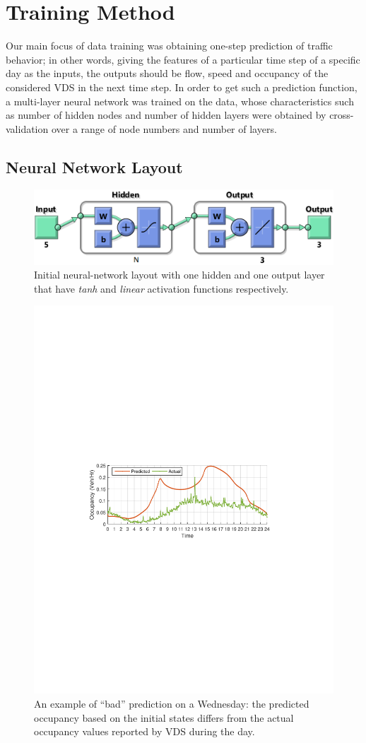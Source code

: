 \documentclass[twocolumn,10pt]{asme2e}
\begin{document}
\section{Training Method}
Our main focus of data training was obtaining one-step prediction of traffic behavior; in other words, giving the features of a particular time step of a specific day as the inputs, the outputs should be flow, speed and occupancy of the considered VDS in the next time step. In order to get such a prediction function, a multi-layer neural network was trained on the data, whose characteristics such as number of hidden nodes and number of hidden layers were obtained by cross-validation over a range of node numbers and number of layers.

\subsection{Neural Network Layout}

\begin{figure}[t]
	\centering
	\includegraphics[width=1\linewidth]{./Figures/NN_1}
	\caption{Initial neural-network layout with one hidden and one output layer that have \emph{tanh} and \emph{linear} activation functions respectively. }
	\label{fig:nn1}
\end{figure} 


\begin{figure}[t]
	\centering
	\includegraphics[width=0.7\linewidth]{./Figures/badPrediction}
	\caption{An example of ``bad'' prediction on a Wednesday: the predicted occupancy based on the initial states differs from the actual occupancy values reported by VDS during the day.}
	\label{fig:badPrediction}
\end{figure}
\end{document}
